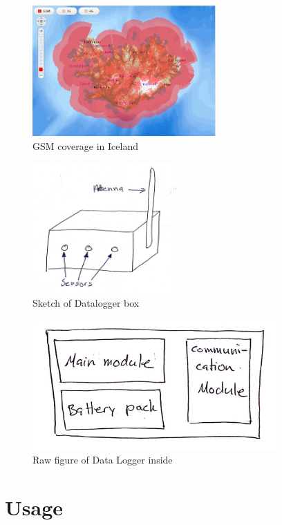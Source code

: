 \documentclass[12pt,a4paper,titlepage]{article}
\begin{document}
\begin{figure}
\centering
\includegraphics[height=50mm]{graphics/GSM_Coverage.PNG}
\caption{GSM coverage in Iceland\label{fig:GSM-Coverage} \cite{vodafone}}
\end{figure}

\begin{figure}
\centering
\includegraphics[height=50mm]{graphics/Logging_box.PNG}
\caption{Sketch of Datalogger box\label{fig:Logging_box} \cite{Helgason2014}}
\end{figure}

\begin{figure}
\centering
\includegraphics[height=50mm]{graphics/Inside_box.PNG}
\caption{Raw figure of Data Logger inside\label{fig:Inside} \cite{LoggingBox}}
\end{figure}

\section{Usage} 
\end{document}
